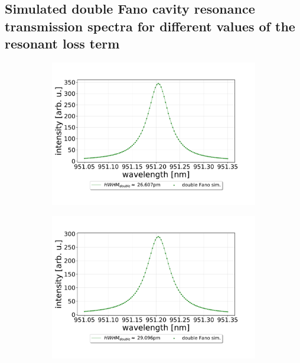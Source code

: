 \newpage
\subsection{Simulated double Fano cavity resonance transmission spectra for different values of the resonant loss term}

\begin{figure}[h!]
    \centering
    \begin{subfigure}[b]{0.49\textwidth}
        \includegraphics[width=\textwidth]{figures/double_1percent_loss_30um.pdf}
        \caption{}
        \label{fig:1_percent_loss}
    \end{subfigure}
    \begin{subfigure}[b]{0.49\textwidth}
        \includegraphics[width=\textwidth]{figures/double_2percent_loss_30um.pdf}
        \caption{}

\end{subfigure}
\end{figure}
